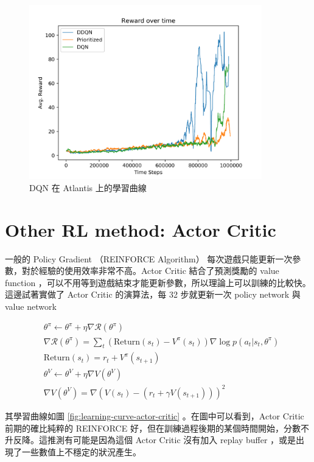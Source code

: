 \documentclass[fleqn,a4paper,12pt]{article}
\begin{document}
\begin{figure}[h]
  \centering
  \includegraphics[width=0.9\textwidth]{figures/atlantis.png}
  \caption{DQN 在 Atlantis 上的學習曲線}
  \label{fig:learning-curve-dqn-atlantis}
\end{figure}




\section{Other RL method: Actor Critic}

一般的 Policy Gradient （REINFORCE Algorithm） 每次遊戲只能更新一次參數，對於經驗的使用效率非常不高。Actor Critic 結合了預測獎勵的 value function ，可以不用等到遊戲結束才能更新參數，所以理論上可以訓練的比較快。這邊試著實做了 Actor Critic 的演算法，每 32 步就更新一次 policy network 與 value network

\begin{align*}
  & \theta^{\pi} \leftarrow \theta^{\pi} + \eta \nabla \mathcal{R}(\theta^\pi) \\
  & \nabla \mathcal{R}(\theta^\pi) = \sum_t (\mathrm{Return}(s_t) - V^\pi(s_t)) \nabla \log p(a_t | s_t, \theta^\pi) \\
  & \mathrm{Return}(s_t) = r_t + V^\pi(s_{t+1}) \\
  & \theta^{V} \leftarrow \theta^{V} + \eta \nabla V(\theta^V) \\
  & \nabla V(\theta^V) = \nabla (V(s_t) - (r_t + \gamma V(s_{t+1})))^2 
\end{align*}

其學習曲線如圖 \ref{fig:learning-curve-actor-critic} 。在圖中可以看到，Actor Critic 前期的確比純粹的 REINFORCE 好，但在訓練過程後期的某個時間開始，分數不升反降。這推測有可能是因為這個 Actor Critic 沒有加入 replay buffer ，或是出現了一些數值上不穩定的狀況產生。
\end{document}
